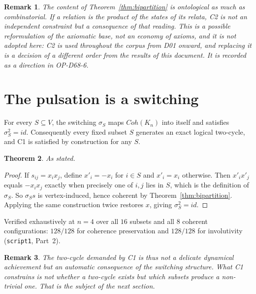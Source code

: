 \documentclass[11pt,a4paper]{article}
\def\mathrm#1{#1}%
\newtheorem{theorem}{Theorem}[section]
\newtheorem{remark}[theorem]{Remark}
\newcommand{\Kn}{K_n}
\newcommand{\Coh}{\mathrm{Coh}}
\begin{document}
\begin{remark}
The content of Theorem~\ref{thm:bipartition} is ontological as much as combinatorial. If a relation is the product of the states of its relata, C2 is not an independent constraint but a consequence of that reading. This is a possible reformulation of the axiomatic base, not an economy of axioms, and it is not adopted here: C2 is used throughout the corpus from D01 onward, and replacing it is a decision of a different order from the results of this document. It is recorded as a direction in OP-D68-6.
\end{remark}

\section{The pulsation is a switching}
\label{sec:pulsation}

\begin{theorembox}
For every $S\subseteq V$, the switching $\sigma_S$ maps $\Coh(\Kn)$ into itself and satisfies $\sigma_S^2=\mathrm{id}$. Consequently every fixed subset $S$ generates an exact logical two-cycle, and C1 is satisfied by construction for any $S$.
\end{theorembox}

\begin{theorem}
\label{thm:involution}
As stated.
\end{theorem}

\begin{proof}
If $s_{ij}=x_ix_j$, define $x'_i=-x_i$ for $i\in S$ and $x'_i=x_i$ otherwise. Then $x'_ix'_j$ equals $-x_ix_j$ exactly when precisely one of $i,j$ lies in $S$, which is the definition of $\sigma_S$. So $\sigma_S s$ is vertex-induced, hence coherent by Theorem~\ref{thm:bipartition}. Applying the same construction twice restores $x$, giving $\sigma_S^2=\mathrm{id}$.
\end{proof}

Verified exhaustively at $n=4$ over all $16$ subsets and all $8$ coherent configurations: $128/128$ for coherence preservation and $128/128$ for involutivity (\texttt{script1}, Part~2).

\begin{remark}
The two-cycle demanded by C1 is thus not a delicate dynamical achievement but an automatic consequence of the switching structure. What C1 constrains is not \emph{whether} a two-cycle exists but \emph{which} subsets produce a non-trivial one. That is the subject of the next section.
\end{remark}
\end{document}
